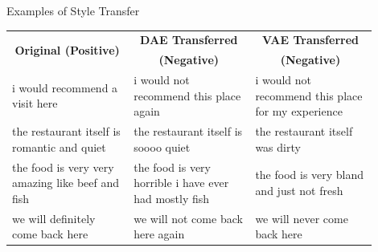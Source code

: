 \documentclass[aspectratio=169]{beamer}
\newcommand{\tabh}[1]{\multicolumn{1}{c|}{\textbf{#1}}}
\newcommand{\tabc}[2]{\multicolumn{1}{|c|}{\multirow{#1}{*}{\textbf{#2}}}}
\begin{document}
\begin{frame}{Examples of Style Transfer}
	\centering
	\begin{table}[ht]
		\centering
		\begin{tabular}{| p{0.3\linewidth} | p{0.3\linewidth} | p{0.3\linewidth} |}
			\hline
			\tabc{2}{Original (Positive)}                    & \tabh{DAE Transferred}                                & \tabh{VAE Transferred}                             \\
			                                                 & \tabh{(Negative)}                                     & \tabh{(Negative)}                                  \\
			\hline
			\hline
			i would recommend a visit here                   & i would not recommend this place again                & i would not recommend this place for my experience \\
			\hline
			the restaurant itself is romantic and quiet      & the restaurant itself is soooo quiet                  & the restaurant itself was dirty                    \\
			\hline
			the food is very very amazing like beef and fish & the food is very horrible i have ever had mostly fish & the food is very bland and just not fresh          \\
			\hline
			we will definitely come back here                & we will not come back here again                      & we will never come back here                       \\
			\hline
		\end{tabular}
	\end{table}
\end{frame}
\end{document}
